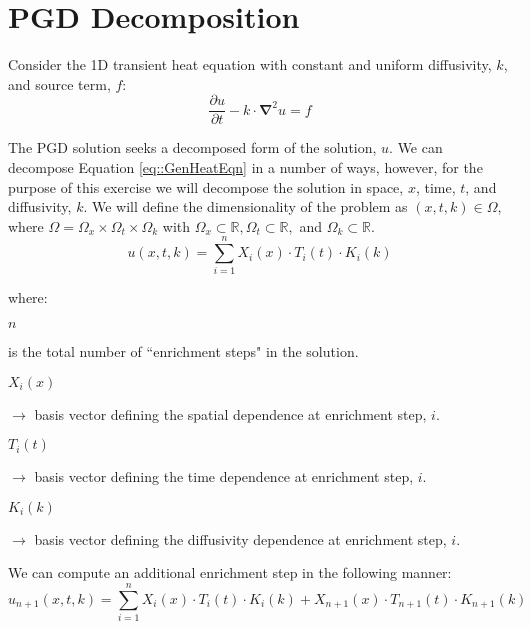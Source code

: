 \documentclass{article}
\def\ds{\displaystyle}
\def\pd{\partial}
\def\grad{\mathbf\nabla}
\begin{document}
\section{PGD Decomposition}
Consider the 1D transient heat equation with constant and uniform diffusivity, $k$, and source term, $f$:
\begin{equation}
\label{eq::GenHeatEqn}
\frac{\pd u}{\pd t} -k\cdot \grad^2 u = f
\end{equation}

The PGD solution seeks a decomposed form of the solution, $u$. We can decompose Equation \ref{eq::GenHeatEqn} in a number of ways, however, for the purpose of this exercise we will decompose the solution in space, $x$, time, $t$, and diffusivity, $k$. We will define the dimensionality of the problem as $\left( x,t,k \right) \in \Omega$, where $\Omega = \Omega_x \times \Omega_t \times \Omega_k$ with $\Omega_x \subset \mathbb{R}, \Omega_t \subset \mathbb{R},$ and $\Omega_k \subset \mathbb{R}$.
\begin{equation}
u(x,t,k) = \ds\sum_{i=1}^n X_i(x) \cdot T_i(t) \cdot K_i(k)
\end{equation}

\vspace{-6pt}where:\\[-3pt]

\hspace*{15pt}\begin{minipage}{4.5in}

$n$
\parbox[t][0.65cm]{4.5in}{ is the total number of ``enrichment steps" in the solution.}

$X_i(x)$
\parbox[t][0.65cm]{4.5in}{ $\to$ basis vector defining the spatial dependence at enrichment step, $i$.}

$T_i(t)$
\parbox[t][0.65cm]{4.5in}{ $\to$ basis vector defining the time dependence at enrichment step, $i$.}

$K_i(k)$
\parbox[t][0.65cm]{4.5in}{ $\to$ basis vector defining the diffusivity dependence at enrichment step, $i$.}

\end{minipage}\vspace{5pt}

We can compute an additional enrichment step in the following manner:
\begin{equation}
\label{eq::TrialFctn}
u_{n+1}(x,t,k) = \ds\sum_{i=1}^n X_i(x) \cdot T_i(t) \cdot K_i(k) + X_{n+1}(x) \cdot T_{n+1}(t) \cdot K_{n+1}(k)
\end{equation}
\end{document}
